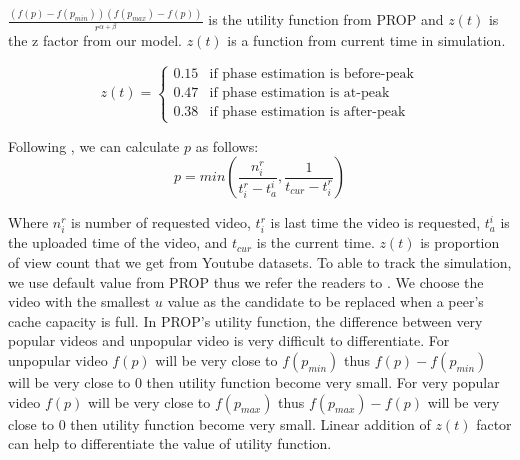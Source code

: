 \documentclass[10pt,final,journal,a4paper]{IEEEtran}
\begin{document}
$\frac{ (f(p) - f(p_{min})) (f(p_{max}) - f(p)) }{r^{\alpha + \beta}}$ is the utility function from PROP and $z(t)$ is the z factor from our model.
$z(t)$ is a function from current time in simulation.


\[
 z(t) =
  \begin{cases}
   0.15 & \text{if phase estimation is before-peak} \\
   0.47 & \text{if phase estimation is at-peak} \\
   0.38 & \text{if phase estimation is after-peak}
  \end{cases}
\]

Following \cite{1613869}, we can calculate $p$ as follows:
\begin{equation}
p = min \left(\frac{n_i^r}{t_i^r - t_a^i}  , \frac{1}{t_{cur} - t_i^r}\right)
\end{equation}

Where $n_i^r$ is number of requested video, $t_i^r$ is last time the video is requested, $t_a^i$ is the uploaded time of the video, and $t_{cur}$ is the current time.
$z(t)$ is proportion of view count that we get from Youtube datasets.  
To able to track the simulation, we use default value from PROP thus we refer the readers to \cite{1613869}.
We choose the video with the smallest $u$ value as the candidate to be replaced when a peer's cache capacity is full.
In PROP's utility function, the difference between very popular videos and unpopular video is very difficult to differentiate. 
For unpopular video $f(p)$ will be very close to $f(p_{min})$ thus $f(p) - f(p_{min})$ will be very close to $0$ then utility function become very small.
For very popular video $f(p)$ will be very close to $f(p_{max})$ thus $f(p_{max}) - f(p)$ will be very close to $0$ then utility function become very small.  
Linear addition of $z(t)$ factor can help to differentiate the value of utility function.
\end{document}
